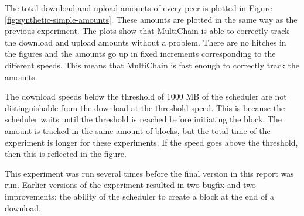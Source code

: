 The total download and upload amounts of every peer is plotted in Figure \ref{fig:synthetic-simple-amounts}.
These amounts are plotted in the same way as the previous experiment.
The plots show that MultiChain is able to correctly track the download and upload amounts without a problem.
There are no hitches in the figures and the amounts go up in fixed increments corresponding to the different speeds.
This means that MultiChain is fast enough to correctly track the amounts.

The download speeds below the threshold of 1000 MB of the scheduler
are not distinguishable from the download at the threshold speed.
This is because the scheduler waits until the threshold is reached before initiating the block.
The amount is tracked in the same amount of blocks,
but the total time of the experiment is longer for these experiments.
If the speed goes above the threshold, then this is reflected in the figure.

This experiment was run several times before the final version in this report was run.
Earlier versions of the experiment resulted in two bugfix and two improvements:
the ability of the scheduler to create a block at the end of a download.